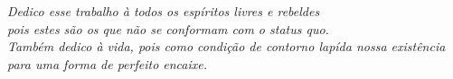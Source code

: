 \begin{dedicatoria}
   \vspace*{\fill}
   \centering
   \noindent

   \textit{Dedico esse trabalho à todos os espíritos livres e rebeldes \\ pois estes são os que não se conformam com o status quo.\\Também dedico à vida, pois como condição de contorno lapída nossa existência para uma forma de perfeito encaixe.} \vspace*{\fill}
\end{dedicatoria}
